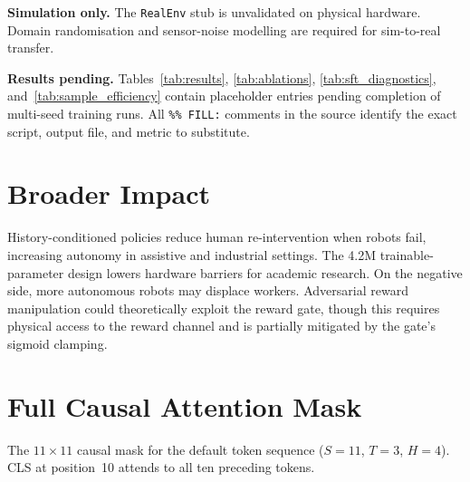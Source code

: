 \documentclass{article}
\begin{document}
\textbf{Simulation only.}
The \texttt{RealEnv} stub is unvalidated on physical hardware.
Domain randomisation and sensor-noise modelling are required for
sim-to-real transfer.

\textbf{Results pending.}
Tables~\ref{tab:results}, \ref{tab:ablations}, \ref{tab:sft_diagnostics},
and~\ref{tab:sample_efficiency} contain placeholder \text{---} entries
pending completion of multi-seed training runs.
All \texttt{\%\% FILL:} comments in the source identify the exact
script, output file, and metric to substitute.

\section*{Broader Impact}

History-conditioned policies reduce human re-intervention when robots
fail, increasing autonomy in assistive and industrial settings.
The 4.2M trainable-parameter design lowers hardware barriers for
academic research.
On the negative side, more autonomous robots may displace workers.
Adversarial reward manipulation could theoretically exploit the reward
gate, though this requires physical access to the reward channel and
is partially mitigated by the gate's sigmoid clamping.




\clearpage
\appendix

\section{Full Causal Attention Mask}
\label{app:mask}

The $11\times11$ causal mask for the default token sequence ($S=11$, $T=3$, $H=4$).
CLS at position~10 attends to all ten preceding tokens.
\end{document}

